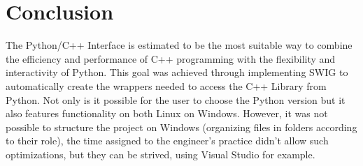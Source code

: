 \chapter{Conclusion}

The Python/C++ Interface is estimated to be the most suitable way to combine the efficiency and performance of C++ programming with the flexibility and interactivity of Python. This goal was achieved through implementing SWIG to automatically create the wrappers needed to access the C++ Library from Python. Not only is it possible for the user to choose the Python version but it also features functionality on both Linux on Windows. However, it was not possible to structure the project on Windows (organizing files in folders according to their role), the time assigned to the engineer's practice didn't allow such optimizations, but they can be strived, using Visual Studio for example.
